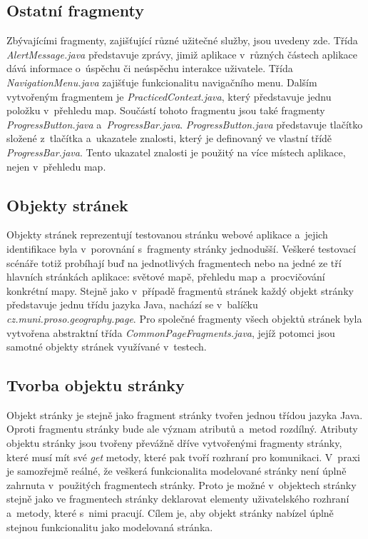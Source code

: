 \documentclass[
    color,   %
	table,   %
    twoside, %
    nolot, nolof,
]{fithesis3}
\begin{document}
\subsection*{Ostatní fragmenty}
Zbývajícími fragmenty, zajišťující různé užitečné služby, jsou uvedeny zde. Třída \emph{AlertMessage.java} představuje zprávy, jimiž aplikace v~různých částech aplikace dává informace o~úspěchu či neúspěchu interakce uživatele. Třída \emph{NavigationMenu.java} zajišťuje funkcionalitu navigačního menu. Dalším vytvořeným fragmentem je \emph{PracticedContext.java}, který představuje jednu položku v~přehledu map. Součástí tohoto fragmentu jsou také fragmenty \emph{ProgressButton.java} a~\emph{ProgressBar.java}. \emph{ProgressButton.java} představuje tlačítko složené z~tlačítka a~ukazatele znalosti, který je definovaný ve vlastní třídě \emph{ProgressBar.java}. Tento ukazatel znalosti je použitý na více místech aplikace, nejen v~přehledu map.

\subsection{Objekty stránek}
Objekty stránek reprezentují testovanou stránku webové aplikace a~jejich identifikace byla v~porovnání s~fragmenty stránky jednodušší. Veškeré testovací scénáře totiž probíhají buď na jednotlivých fragmentech nebo na jedné ze tří hlavních stránkách aplikace: světové mapě, přehledu map a~procvičování konkrétní mapy. Stejně jako v~případě fragmentů stránek každý objekt stránky představuje jednu třídu jazyka Java, nachází se v~balíčku \emph{cz.muni.proso.geography.page}. Pro společné fragmenty všech objektů stránek byla vytvořena abstraktní třída \emph{CommonPageFragments.java}, jejíž potomci jsou samotné objekty stránek využívané v~testech.

\subsection*{Tvorba objektu stránky}
Objekt stránky je stejně jako fragment stránky tvořen jednou třídou jazyka Java. Oproti fragmentu stránky bude ale význam atributů a~metod rozdílný. Atributy objektu stránky jsou tvořeny převážně dříve vytvořenými fragmenty stránky, které musí mít své \emph{get} metody, které pak tvoří rozhraní pro komunikaci. V~praxi je samozřejmě reálné, že veškerá funkcionalita modelované stránky není úplně zahrnuta v~použitých fragmentech stránky. Proto je možné v~objektech stránky stejně jako ve fragmentech stránky deklarovat elementy uživatelského rozhraní a~metody, které s~nimi pracují. Cílem je, aby objekt stránky nabízel úplně stejnou funkcionalitu jako modelovaná stránka.
\end{document}
